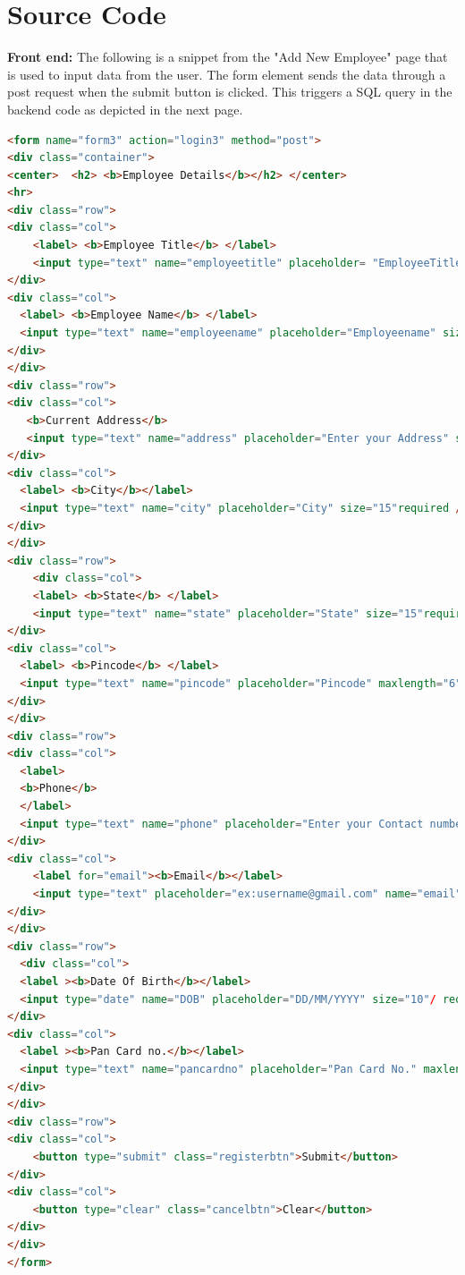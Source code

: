 \documentclass[12pt]{article}
\begin{document}
\newpage                            %
\section{Source Code}               %
\textbf{Front end:}
\noindent
\newline
The following is a snippet from the "Add New Employee" page that is used to input data from the user. The form element sends the data through a post request when the submit button is clicked. This triggers a SQL query in the backend code as depicted in the next page.
\begin{lstlisting}[language = html]
<form name="form3" action="login3" method="post">  
<div class="container">  
<center>  <h2> <b>Employee Details</b></h2> </center>  
<hr> 
<div class="row">
<div class="col">
    <label> <b>Employee Title</b> </label>   
    <input type="text" name="employeetitle" placeholder= "EmployeeTitle" size="15" required />
</div>
<div class="col">
  <label> <b>Employee Name</b> </label>   
  <input type="text" name="employeename" placeholder="Employeename" size="15" required />   
</div>
</div>
<div class="row">
<div class="col">
   <b>Current Address</b>
   <input type="text" name="address" placeholder="Enter your Address" style="width: 500px;height: 150px;" / required/></input>
</div>
<div class="col">
  <label> <b>City</b></label>    
  <input type="text" name="city" placeholder="City" size="15"required />   
</div>
</div>
<div class="row">
    <div class="col">
    <label> <b>State</b> </label>    
    <input type="text" name="state" placeholder="State" size="15"required /> 
</div>
<div class="col">
  <label> <b>Pincode</b> </label>    
  <input type="text" name="pincode" placeholder="Pincode" maxlength="6" pattern="\d{6}" title="Please enter exactly 7 digits" / required >  
</div>
</div>
<div class="row">
<div class="col">
  <label>   
  <b>Phone</b>  
  </label>  
  <input type="text" name="phone" placeholder="Enter your Contact number"  maxlength="10" pattern="\d{10}" title="Please enter exactly 10 digits" / required>   
</div>
<div class="col">
    <label for="email"><b>Email</b></label>  
    <input type="text" placeholder="ex:username@gmail.com" name="email" required>
</div>
</div>
<div class="row">
  <div class="col">
  <label ><b>Date Of Birth</b></label>
  <input type="date" name="DOB" placeholder="DD/MM/YYYY" size="10"/ required>
</div>
<div class="col">
  <label ><b>Pan Card no.</b></label>
  <input type="text" name="pancardno" placeholder="Pan Card No." maxlength="10" pattern="\d{10}" title="Please enter exactly 10 digits" / required>
</div>
</div> 
<div class="row">
<div class="col">
    <button type="submit" class="registerbtn">Submit</button> 
</div>
<div class="col">
    <button type="clear" class="cancelbtn">Clear</button> 
</div>
</div>
</form> 
\end{lstlisting}
\end{document}
